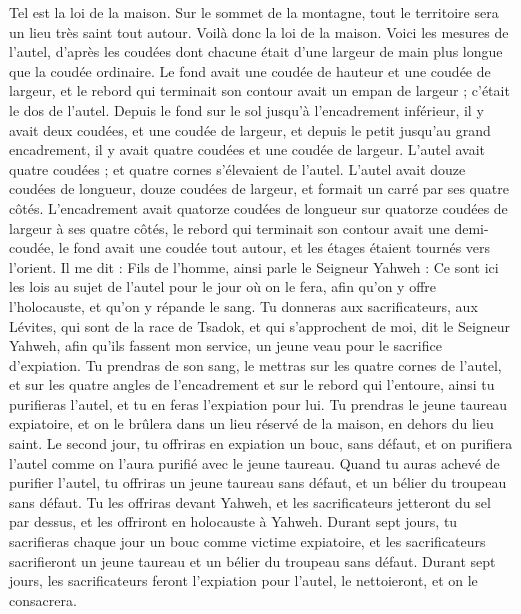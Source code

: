 \begin{multicols}{2}
Tel est la loi de la maison. Sur le sommet de la montagne, tout le territoire sera un lieu très saint tout autour. Voilà donc la loi de la maison.
Voici les mesures de l'autel, d’après les coudées dont chacune était d’une largeur de main plus longue que la coudée ordinaire. Le fond avait une coudée de hauteur et une coudée de largeur, et le rebord qui terminait son contour avait un empan de largeur ; c’était le dos de l’autel.
Depuis le fond sur le sol jusqu’à l’encadrement inférieur, il y avait deux coudées, et une coudée de largeur, et depuis le petit jusqu’au grand encadrement, il y avait quatre coudées et une coudée de largeur.
L’autel avait quatre coudées ; et quatre cornes s’élevaient de l’autel.
L’autel avait douze coudées de longueur, douze coudées de largeur, et formait un carré par ses quatre côtés.
L’encadrement avait quatorze coudées de longueur sur quatorze coudées de largeur à ses quatre côtés, le rebord qui terminait son contour avait une demi-coudée, le fond avait une coudée tout autour, et les étages étaient tournés vers l’orient.
Il me dit : Fils de l’homme, ainsi parle le Seigneur Yahweh : Ce sont ici les lois au sujet de l'autel pour le jour où on le fera, afin qu'on y offre l'holocauste, et qu'on y répande le sang.
Tu donneras aux sacrificateurs, aux Lévites, qui sont de la race de Tsadok, et qui s’approchent de moi, dit le Seigneur Yahweh, afin qu'ils fassent mon service, un jeune veau pour le sacrifice d’expiation.
Tu prendras de son sang, le mettras sur les quatre cornes de l'autel, et sur les quatre angles de l’encadrement et sur le rebord qui l’entoure, ainsi tu purifieras l'autel, et tu en feras l’expiation pour lui.
Tu prendras le jeune taureau expiatoire, et on le brûlera dans un lieu réservé de la maison, en dehors du lieu saint.
Le second jour, tu offriras en expiation un bouc, sans défaut, et on purifiera l'autel comme on l'aura purifié avec le jeune taureau.
Quand tu auras achevé de purifier l'autel, tu offriras un jeune taureau sans défaut, et un bélier du troupeau sans défaut.
Tu les offriras devant Yahweh, et les sacrificateurs jetteront du sel par dessus, et les offriront en holocauste à Yahweh.
Durant sept jours, tu sacrifieras chaque jour un bouc comme victime expiatoire, et les sacrificateurs sacrifieront un jeune taureau et un bélier du troupeau sans défaut.
Durant sept jours, les sacrificateurs feront l’expiation pour l'autel, le nettoieront, et on le consacrera.

\end{multicols}

